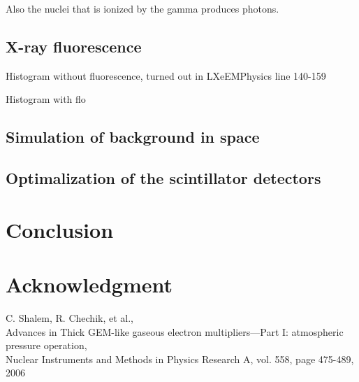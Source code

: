 \documentclass[12pt, a4paper,titlepage]{article}
\numberwithin{equation}{section}
\numberwithin{figure}{section}
\begin{document}
Also the nuclei that is ionized by the gamma produces photons.

\subsection{X-ray fluorescence}
Histogram without fluorescence, turned out in LXeEMPhysics line 140-159

Histogram with flo

\subsection{Simulation of background in space}


\subsection{Optimalization of the scintillator detectors}
\section{Conclusion}

\section{Acknowledgment}

 
\pagebreak

\begin{thebibliography}{99}

 C. Shalem, R. Chechik, et al.,\\
Advances in Thick GEM-like gaseous electron multipliers—Part I: atmospheric pressure operation,\\
Nuclear Instruments and Methods in Physics Research A, vol. 558, page 475-489, 2006

\end{thebibliography}

\pagebreak
\end{document}
